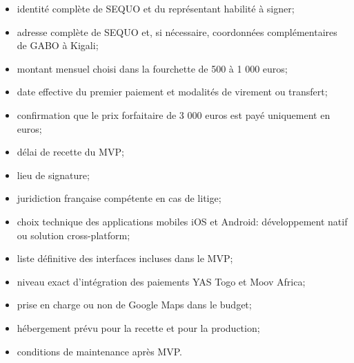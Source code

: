\documentclass[11pt,a4paper]{article}
\begin{document}
\begin{itemize}
    \item identité complète de SEQUO et du représentant habilité à signer;
    \item adresse complète de SEQUO et, si nécessaire, coordonnées complémentaires de GABO à Kigali;
    \item montant mensuel choisi dans la fourchette de 500 à 1 000 euros;
    \item date effective du premier paiement et modalités de virement ou transfert;
    \item confirmation que le prix forfaitaire de 3 000 euros est payé uniquement en euros;
    \item délai de recette du MVP;
    \item lieu de signature;
    \item juridiction française compétente en cas de litige;
    \item choix technique des applications mobiles iOS et Android: développement natif ou solution cross-platform;
    \item liste définitive des interfaces incluses dans le MVP;
    \item niveau exact d'intégration des paiements YAS Togo et Moov Africa;
    \item prise en charge ou non de Google Maps dans le budget;
    \item hébergement prévu pour la recette et pour la production;
    \item conditions de maintenance après MVP.
\end{itemize}
\end{document}
